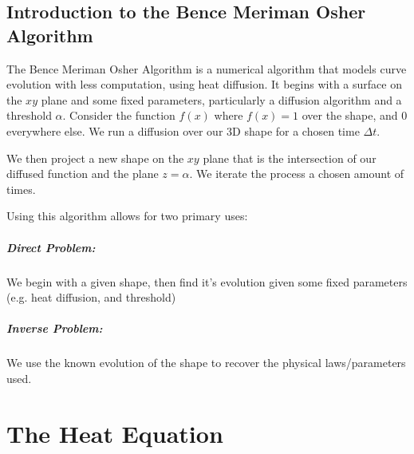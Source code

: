 \documentclass[12pt]{article}
\theoremstyle{plain}
\theoremstyle{definition}
\theoremstyle{remark}
\begin{document}
\subsection{Introduction to the Bence Meriman Osher Algorithm}

The Bence Meriman Osher Algorithm is a numerical algorithm that models curve evolution with less computation, using heat diffusion. It begins with a surface on the $xy$ plane and some fixed parameters, particularly a diffusion algorithm and a threshold $\alpha$. Consider the function $f(x)$ where $f(x) = 1$ over the shape, and $0$ everywhere else. We run a diffusion over our 3D shape for a chosen time $\Delta t$. 

We then project a new shape on the $xy$ plane that is the intersection of our diffused function and the plane $z=\alpha$. We iterate the process a chosen amount of times. 

Using this algorithm allows for two primary uses: 
\subparagraph*{Direct Problem:} We begin with a given shape, then find it's evolution given some fixed parameters (e.g. heat diffusion, and threshold) 
\subparagraph*{Inverse Problem:} We use the known evolution of the shape to recover the physical laws/parameters used. 


\section{The Heat Equation}
\end{document}
